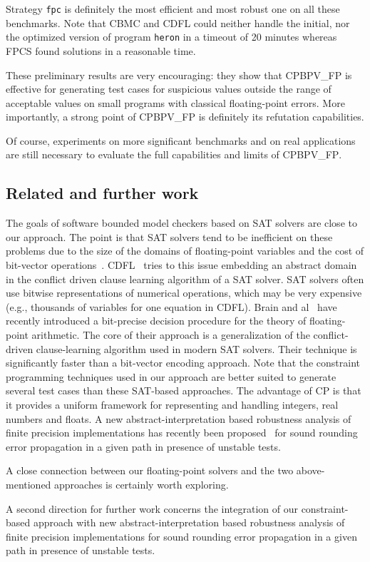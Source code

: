 \documentclass[a4paper]{llncs}
\newcommand{\olivier}[2]{\ifempty{#1}{\textcolor{black}{#2}}{(\sout{#1}) \textcolor{red}{#2}}}
\newcommand{\CBMC}{\textsc{CBMC}}
\newcommand{\CDFL}{\textsc{CDFL}}
\newcommand{\FPCS}{\textsc{FPCS}}
\newcommand{\OUR}{\textsc{CPBPV\_FP}}
\begin{document}
Strategy \lstinline|fpc| is definitely the
most efficient and most robust one on all these benchmarks. Note that
\CBMC{} and \CDFL{} could neither handle the initial,  nor the
optimized version of program \lstinline|heron| in  a timeout of 20
minutes whereas \FPCS{} found solutions in a reasonable time.  

These preliminary results  are very encouraging: they show that {\OUR} is effective for generating test cases for suspicious values outside the range of
acceptable values on small programs with
classical floating-point errors. More importantly,  a strong point of  {\OUR} is definitely its refutation capabilities.

 Of course, experiments on more significant benchmarks and on real applications are still necessary to evaluate the full capabilities and limits of \OUR{}. 


\subsection{Related and further work}



The goals of software bounded model checkers based on SAT solvers are close to our
approach.  The point is that SAT
solvers tend to be inefficient on these problems due to the size of
the domains of floating-point variables and the cost of bit-vector
operations~\cite{DHKT12}. \CDFL{}~\cite{DHKT12} tries to
\olivier{}{address} this issue \olivier{}{by} embedding an abstract
domain in the conflict driven clause learning algorithm of a SAT
solver. SAT solvers often use bitwise representations of numerical operations, which may be very expensive (e.g., thousands of variables for one equation in CDFL).  Brain and al~\cite{HallerGBK12,BrainDGHK13} have recently introduced  a bit-precise decision procedure for the theory of floating-point arithmetic. The core of their approach is a generalization of the conflict-driven clause-learning algorithm used in modern SAT solvers. Their technique is significantly faster than a bit-vector encoding approach.
Note that the constraint programming techniques used in our approach
are better suited to generate several test cases than these SAT-based
approaches. The advantage of CP is that it provides a uniform framework for representing and handling integers, real numbers and floats. 
A new abstract-interpretation based robustness analysis of finite
precision implementations has recently been
proposed~\cite{GoubaultP13}  for sound rounding error propagation in a
given path in presence of unstable tests.



A close connection between our floating-point solvers and the  two
above-mentioned approaches is certainly worth exploring.

A second direction for further work concerns  the integration of our constraint-based
approach with  new abstract-interpretation based robustness analysis of finite
precision implementations for sound rounding error propagation in a
given path in presence of unstable tests.









\small

\end{document}
